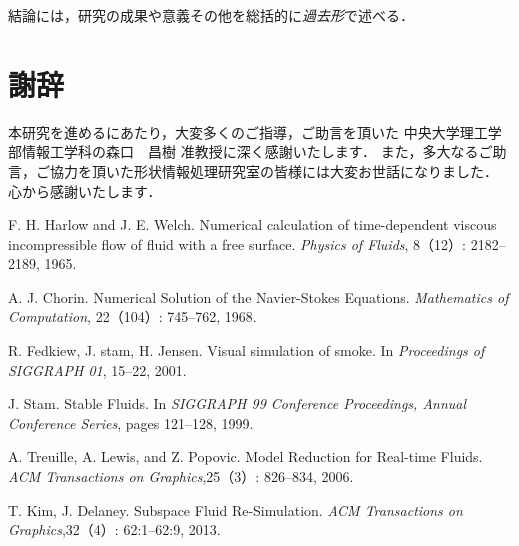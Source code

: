 \documentclass[a4j,12pt]{jreport}
\def\syaji{ \chapter*{謝辞} \addcontentsline{toc}{chapter}{謝辞}}
\begin{document}


結論には，研究の成果や意義その他を総括的に{\em 過去形}で述べる．

\syaji
\par
本研究を進めるにあたり，大変多くのご指導，ご助言を頂いた
中央大学理工学部情報工学科の森口　昌樹 准教授に深く感謝いたします．
また，多大なるご助言，ご協力を頂いた形状情報処理研究室の皆様には大変お世話になりました．
心から感謝いたします．


\begin{thebibliography}{99}
F. H. Harlow and J. E. Welch. Numerical calculation of time-dependent viscous incompressible flow of fluid with a free surface. \textit{Physics of Fluids}, 8（12）: 2182--2189, 1965.

A. J. Chorin. Numerical Solution of the Navier-Stokes Equations. \textit{Mathematics of Computation}, 22（104）: 745--762, 1968.

R. Fedkiew, J. stam, H. Jensen. Visual simulation of smoke. In \textit{Proceedings of SIGGRAPH 01}, 15--22, 2001.

J. Stam. Stable Fluids. In \textit{SIGGRAPH 99 Conference Proceedings, Annual Conference Series}, pages 121--128, 1999.

A. Treuille, A. Lewis, and Z. Popovic. Model Reduction for Real-time Fluids. \textit{ACM Transactions on Graphics},25（3）: 826--834, 2006.

T. Kim, J. Delaney. Subspace Fluid Re-Simulation. \textit{ACM Transactions on Graphics},32（4）: 62:1--62:9, 2013.



\end{thebibliography}
\end{document}
